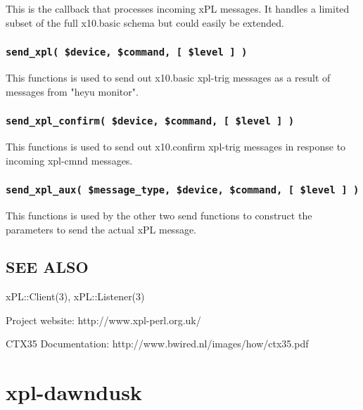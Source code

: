 \documentclass[12pt,a4paper]{article}
\begin{document}
This is the callback that processes incoming xPL messages.  It handles
a limited subset of the full x10.basic schema but could easily be
extended.

\subsubsection*{\texttt{send\_xpl( \$device, \$command, [ \$level ] )}\label{xpl-ctx35_send_xpl_device_command_level_}}


This functions is used to send out x10.basic xpl-trig messages as a
result of messages from "heyu monitor".

\subsubsection*{\texttt{send\_xpl\_confirm( \$device, \$command, [ \$level ] )}\label{xpl-ctx35_send_xpl_confirm_device_command_level_}}


This functions is used to send out x10.confirm xpl-trig messages in
response to incoming xpl-cmnd messages.

\subsubsection*{\texttt{send\_xpl\_aux( \$message\_type, \$device, \$command, [ \$level ] )}\label{xpl-ctx35_send_xpl_aux_message_type_device_command_level_}}


This functions is used by the other two send functions to construct the
parameters to send the actual xPL message.

\subsection*{SEE ALSO\label{xpl-ctx35_SEE_ALSO}}


xPL::Client(3), xPL::Listener(3)



Project website: http://www.xpl-perl.org.uk/



CTX35 Documentation: http://www.bwired.nl/images/how/ctx35.pdf

\newpage
\section{xpl-dawndusk\label{xpl-dawndusk}}
\end{document}
